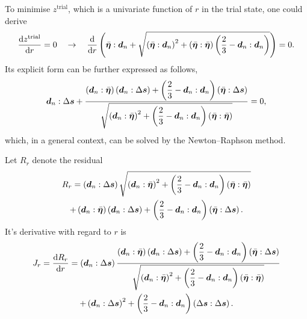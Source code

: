 To minimise $z^\text{trial}$, which is a univariate function of $r$ in the trial state, one could derive
\begin{gather}
    \dfrac{\mathrm{d}z^\text{trial}}{\mathrm{d}r}=0\quad\rightarrow\quad
    \dfrac{\mathrm{d}}{\mathrm{d}r}\left(\bar{\bm{\eta}}:\bm{d}_n+\sqrt{\left(\bar{\bm{\eta}}:\bm{d}_n\right)^2+\left(\bar{\bm{\eta}}:\bar{\bm{\eta}}\right)\left(\dfrac{2}{3}-\bm{d}_n:\bm{d}_n\right)}\right)=0.
\end{gather}
Its explicit form can be further expressed as follows,
\begin{gather}
    \bm{d}_n:\Delta\bm{s}+\dfrac{\left(\bm{d}_n:\bar{\bm{\eta}}\right)\left(\bm{d}_n:\Delta\bm{s}\right)+\left(\dfrac{2}{3}-\bm{d}_n:\bm{d}_n\right)\left(\bar{\bm{\eta}}:\Delta\bm{s}\right)}{\sqrt{\left(\bm{d}_n:\bar{\bm{\eta}}\right)^2+\left(\dfrac{2}{3}-\bm{d}_n:\bm{d}_n\right)\left(\bar{\bm{\eta}}:\bar{\bm{\eta}}\right)}}=0,
\end{gather}
which, in a general context, can be solved by the Newton--Raphson method.

Let $R_r$ denote the residual
\begin{multline}\label{eq:z_residual}
    R_r=\left(\bm{d}_n:\Delta\bm{s}\right)\sqrt{\left(\bm{d}_n:\bar{\bm{\eta}}\right)^2+\left(\dfrac{2}{3}-\bm{d}_n:\bm{d}_n\right)\left(\bar{\bm{\eta}}:\bar{\bm{\eta}}\right)}\\
    +\left(\bm{d}_n:\bar{\bm{\eta}}\right)\left(\bm{d}_n:\Delta\bm{s}\right)+\left(\dfrac{2}{3}-\bm{d}_n:\bm{d}_n\right)\left(\bar{\bm{\eta}}:\Delta\bm{s}\right).
\end{multline}
It's derivative with regard to $r$ is
\begin{multline}\label{eq:z_derivative}
    J_r=\dfrac{\mathrm{d}R_r}{\mathrm{d}r}=\left(\bm{d}_n:\Delta\bm{s}\right)\dfrac{\left(\bm{d}_n:\bar{\bm{\eta}}\right)\left(\bm{d}_n:\Delta\bm{s}\right)+\left(\dfrac{2}{3}-\bm{d}_n:\bm{d}_n\right)\left(\bar{\bm{\eta}}:\Delta\bm{s}\right)}{\sqrt{\left(\bm{d}_n:\bar{\bm{\eta}}\right)^2+\left(\dfrac{2}{3}-\bm{d}_n:\bm{d}_n\right)\left(\bar{\bm{\eta}}:\bar{\bm{\eta}}\right)}}\\
    +\left(\bm{d}_n:\Delta\bm{s}\right)^2+\left(\dfrac{2}{3}-\bm{d}_n:\bm{d}_n\right)\left(\Delta\bm{s}:\Delta\bm{s}\right).
\end{multline}

